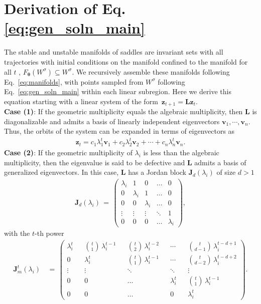 \documentclass{article}
\theoremstyle{example}
\theoremstyle{plain}
\theoremstyle{definition}
\theoremstyle{remark}
\def\eqref#1{equation~\ref{#1}}
\def\vv{{\bm{v}}}
\def\vz{{\bm{z}}}
\def\mJ{{\bm{J}}}
\def\mL{{\bm{L}}}
\renewcommand{\eqref}[1]{Eq.~\ref{#1}}
\begin{document}
\section{Derivation of Eq. \ref{eq:gen_soln_main}}
\label{App: degenerate Eigenvalues}
The stable and unstable manifolds of saddles are invariant sets with all trajectories with initial conditions on the manifold confined to the manifold for all $t$ \citep{alligood1996,per}, $F_{\mathbf{\theta}}(W^{\sigma}) \subseteq W^{\sigma}$. We recursively assemble these manifolds following \eqref{eq:manifolds}, with points sampled from $W^{\sigma}$ following \eqref{eq:gen_soln_main} within each linear subregion. Here we derive this equation starting with a linear system of the form $ \, \vz_{t+1} = \mL \vz_t $.
\\[1ex]
\textbf{Case (1)}: If the geometric multiplicity equals the algebraic multiplicity, then $\mL$ is diagonalizable and admits a basis of linearly independent eigenvectors $\vv_1, \cdots, \vv_n$. Thus, the orbits of the system can be expanded in terms of eigenvectors as 
 \begin{align}
  \vz_t = c_1 \lambda_1^t \vv_1 + c_2 \lambda_2^t \vv_2 + \cdots + c_n \lambda_n^t \vv_n.   
\end{align}
\textbf{Case (2)}: If the geometric multiplicity of $\lambda_i$ is less than the algebraic multiplicity, then the eigenvalue is said to be defective and $\mL$ admits a basis of generalized eigenvectors. In this case, $\mL$ has a Jordan block $\mJ_d (\lambda_i)$ of size $d> 1$
\begin{align*}
\mJ_d (\lambda_i) \, = \, \begin{pmatrix}
\lambda_i & 1 & 0 & \dots & 0 \\
0 & \lambda_i & 1 & \dots & 0 \\
0 & 0 & \lambda_i & \dots & 0 \\
\vdots & \vdots & \vdots & \ddots & 1 \\
0 & 0 & 0 & \dots & \lambda_i
\end{pmatrix},  
\end{align*}
with the $t$-th power 
\begin{align*}\label{}
\mJ^t_m (\lambda_i) &\, = \, 
\begin{pmatrix}
\lambda_i^{t} && {t \choose 1}\,\lambda_i^{{t}-1} && {t \choose 2}\,\lambda_i^{{t}-2} && \cdots && {t \choose d-1}\,\lambda_i^{{t}-d+1}\\[1ex]
%
0 && \lambda_i^{t} && {t \choose 1}\,\lambda_i^{{t}-1} && \cdots && {t \choose d-2}\,\lambda_i^{{t}-d+2}\\[1ex]
%
\vdots && \vdots && \ddots && \ddots && \vdots \\[1ex]
%
0 &&  0 && \hdots && \lambda_i^{t} &&  {t \choose 1}\,\lambda_i^{{t}-1}\\[1ex]
%
0 &&  0 && \hdots && 0 && \lambda_i^{t}
\end{pmatrix}.
%
\end{align*}
\end{document}
